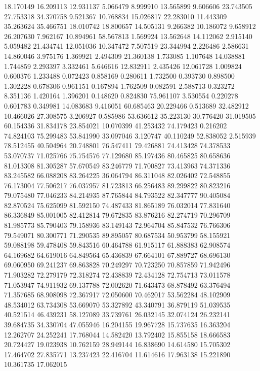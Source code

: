 18.170149
16.209113
12.931137
5.066479
8.999910
13.565899
9.606606
23.743505
27.753318
34.370758
9.521367
10.768834
15.026817
22.283010
11.443309
35.263624
35.466751
18.010742
18.800657
14.505131
9.266382
10.186072
9.658912
26.207630
7.962167
10.894961
58.567813
1.569924
13.562648
14.112062
2.915140
5.059482
21.434741
12.051036
10.347472
7.507519
23.344994
2.226486
2.586631
14.860046
3.975176
1.369921
2.494309
21.360138
1.733085
1.107648
14.038881
1.744859
2.293397
3.332461
5.646616
12.832911
2.435426
12.061728
1.009824
0.600376
1.233488
0.072423
0.858169
0.280611
1.732500
0.393730
0.898500
1.302228
0.678306
0.961151
0.167894
1.762509
0.082591
2.588713
0.323272
8.351136
1.420164
1.396201
0.148620
0.824830
75.961107
3.530554
0.220278
0.601783
0.349981
14.083683
9.416051
60.685463
20.229466
0.513689
32.482912
10.466026
27.308575
3.206927
0.585986
53.636612
35.223130
30.776420
31.019505
60.154336
31.834178
23.854021
10.070399
41.253432
74.179423
0.216202
74.824103
75.299483
53.841990
33.097046
3.120747
40.110249
52.838052
2.515939
78.512455
40.504964
20.748801
76.547411
79.426881
74.413428
74.378533
53.070737
71.025766
75.754576
77.129680
85.197436
80.465825
80.658636
81.013308
81.305287
57.670549
83.246779
71.700827
73.413963
74.371336
83.245582
66.088208
83.264225
36.064794
86.311048
82.026402
72.548855
76.173004
77.506217
76.037957
81.723813
66.256483
89.299822
80.823216
79.075480
77.046233
84.214935
87.765844
84.793522
82.347777
90.405084
82.870524
75.625099
81.592150
74.487433
81.865189
76.032014
77.831640
86.336849
85.001005
82.412814
79.672835
83.876216
82.274719
70.296709
81.985773
85.790403
79.158936
83.149143
72.964704
85.847532
76.766306
79.549071
80.300771
71.290535
89.895057
80.687534
50.953799
58.155921
59.088198
59.478408
59.843516
60.464788
61.915117
61.888383
62.908574
64.169682
64.619016
64.849564
65.436839
67.664101
67.889727
68.696130
69.060950
69.241237
69.863828
70.249297
70.723250
70.857859
71.942496
71.903282
72.279179
72.318274
72.438839
72.434128
72.754713
73.011578
71.053947
74.911932
69.137788
72.002620
71.643473
68.878492
63.376494
71.357685
68.908098
72.367917
72.050600
70.462017
53.562284
48.102909
48.534012
63.734308
53.669070
53.327892
43.340791
36.879119
51.039535
40.521514
46.439231
58.127089
33.739761
26.032145
32.074124
26.232141
39.684735
34.330704
47.055946
16.204155
19.967728
15.737635
16.363204
12.262707
24.252241
17.768044
14.582420
13.792402
15.855158
18.666583
20.724427
19.023938
10.762159
28.949144
16.838690
14.614580
15.705302
17.464702
27.835771
13.237423
22.416704
11.614616
17.963138
15.221890
10.361735
17.062015

